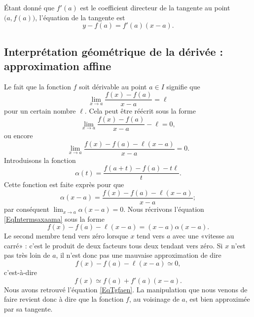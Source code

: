 Étant donné que \( f'(a)\) est le coefficient directeur de la tangente au point \( \big( a,f(a) \big)\), l'équation de la tangente est
\begin{equation}		\label{EqTgfaen}
	y-f(a)=f'(a)(x-a).
\end{equation}

\subsection[Interprétation géométrique : approximation affine]{Interprétation géométrique de la dérivée : approximation affine}

Le fait que la fonction \( f\) soit dérivable au point \( a\in I\) signifie que
\begin{equation}
	\lim_{x\to a} \frac{ f(x)-f(a) }{ x-a }=\ell
\end{equation}
pour un certain nombre \( \ell\). Cela peut être réécrit sous la forme
\begin{equation}
	\lim_{x\to a} \frac{ f(x)-f(a) }{ x-a }-\ell=0,
\end{equation}
ou encore
\begin{equation}
	\lim_{x\to a} \frac{ f(x)-f(a)-\ell(x-a) }{ x-a }=0.
\end{equation}
Introduisons la fonction
\begin{equation}
	\alpha(t)=\frac{ f(a+t)-f(a)-t\ell }{ t }.
\end{equation}
Cette fonction est faite exprès pour que
\begin{equation}		\label{EqIntermsaxaama}
	\alpha(x-a)=\frac{ f(x)-f(a)-\ell(x-a) }{ x-a };
\end{equation}
par conséquent \( \lim_{x\to a} \alpha(x-a)=0\). Nous récrivons l'équation \eqref{EqIntermsaxaama} sous la forme
\begin{equation}        \label{EqCodeDerviffxam}
	f(x)-f(a)-\ell(x-a)=(x-a)\alpha(x-a).
\end{equation}
Le second membre tend vers zéro lorsque \( x\) tend vers \( a\) avec une «vitesse au carré» : c'est le produit de deux facteurs tous deux tendant vers zéro. Si \( x\) n'est pas très loin de \( a\), il n'est donc pas une mauvaise approximation de dire
\begin{equation}
	f(x)-f(a)-\ell(x-a)\simeq 0,
\end{equation}
c'est-à-dire
\begin{equation}		\label{Eqfxsimesfa}
	f(x)\simeq f(a)+f'(a)(x-a).
\end{equation}
Nous avons retrouvé l'équation \eqref{EqTgfaen}. La manipulation que nous venons de faire revient donc à dire que la fonction \( f\), au voisinage de \( a\), est bien approximée par sa tangente.

